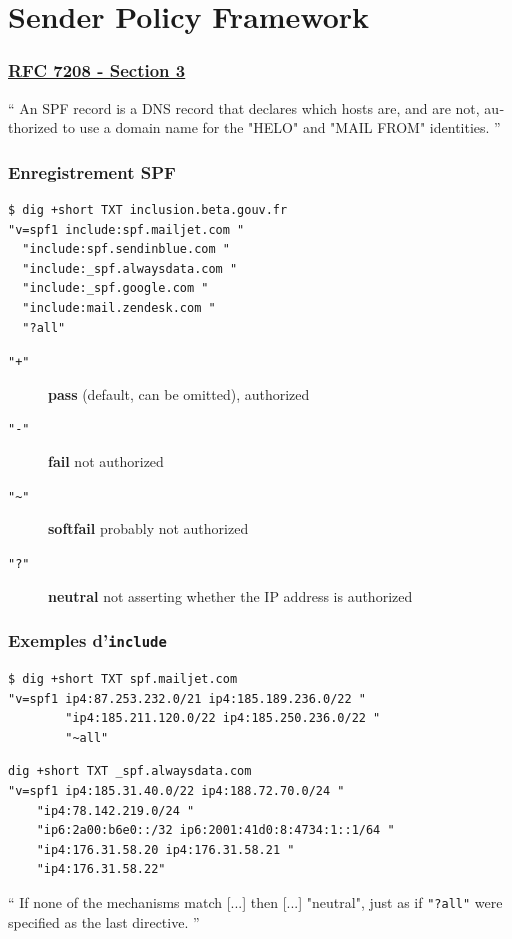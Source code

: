 \documentclass{beamer}
\begin{document}
\section{Sender Policy Framework}

\begin{frame}[fragile]
    \frametitle{\href{https://datatracker.ietf.org/doc/html/rfc7208\#section-3}{RFC 7208 - Section 3}}

    \foreignquote{english}{
        An SPF record is a DNS record that declares which hosts are, and are
        not, authorized to use a domain name for the "HELO" and "MAIL FROM"
        identities.
    }
\end{frame}

\begin{frame}[fragile]
    \frametitle{Enregistrement SPF}
    \begin{verbatim}
$ dig +short TXT inclusion.beta.gouv.fr
"v=spf1 include:spf.mailjet.com "
  "include:spf.sendinblue.com "
  "include:_spf.alwaysdata.com "
  "include:_spf.google.com "
  "include:mail.zendesk.com "
  "?all"
    \end{verbatim}

    \begin{description}
        \item[\texttt{"+"}] \textbf{pass} (default, can be omitted), authorized
        \item[\texttt{"-"}] \textbf{fail} not authorized
        \item[\texttt{"\~{}"}] \textbf{softfail} probably not authorized
        \item[\texttt{"?"}] \textbf{neutral} not asserting whether the IP address is authorized
    \end{description}
\end{frame}

\begin{frame}[fragile]
    \frametitle{Exemples d'\texttt{include}}
    \begin{verbatim}
$ dig +short TXT spf.mailjet.com
"v=spf1 ip4:87.253.232.0/21 ip4:185.189.236.0/22 "
        "ip4:185.211.120.0/22 ip4:185.250.236.0/22 "
        "~all"
    \end{verbatim}

    \begin{verbatim}
dig +short TXT _spf.alwaysdata.com
"v=spf1 ip4:185.31.40.0/22 ip4:188.72.70.0/24 "
    "ip4:78.142.219.0/24 "
    "ip6:2a00:b6e0::/32 ip6:2001:41d0:8:4734:1::1/64 "
    "ip4:176.31.58.20 ip4:176.31.58.21 "
    "ip4:176.31.58.22"
    \end{verbatim}

    \foreignquote{english}{
        If none of the mechanisms match [...] then [...] "neutral", just as if
        \texttt{"?all"} were specified as the last directive.
    }
\end{frame}
\end{document}
